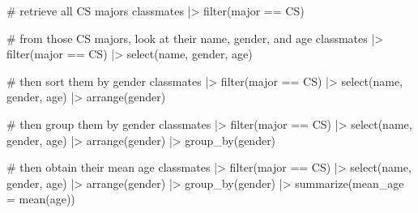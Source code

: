 \documentclass[
  letterpaper,
  DIV=11,
  numbers=noendperiod]{scrreprt}
\newenvironment{Shaded}{\begin{snugshade}}{\end{snugshade}}
\newcommand{\AttributeTok}[1]{\textcolor[rgb]{0.40,0.45,0.13}{#1}}
\newcommand{\CommentTok}[1]{\textcolor[rgb]{0.37,0.37,0.37}{#1}}
\newcommand{\FunctionTok}[1]{\textcolor[rgb]{0.28,0.35,0.67}{#1}}
\newcommand{\NormalTok}[1]{\textcolor[rgb]{0.00,0.23,0.31}{#1}}
\newcommand{\SpecialCharTok}[1]{\textcolor[rgb]{0.37,0.37,0.37}{#1}}
\newcommand{\StringTok}[1]{\textcolor[rgb]{0.13,0.47,0.30}{#1}}
\begin{document}
\begin{tcolorbox}[enhanced jigsaw, colbacktitle=quarto-callout-tip-color!10!white, opacitybacktitle=0.6, breakable, left=2mm, leftrule=.75mm, toprule=.15mm, toptitle=1mm, bottomtitle=1mm, colframe=quarto-callout-tip-color-frame, opacityback=0, coltitle=black, arc=.35mm, titlerule=0mm, colback=white, bottomrule=.15mm, title=\textcolor{quarto-callout-tip-color}{\faLightbulb}\hspace{0.5em}{Answer}, rightrule=.15mm]

\begin{Shaded}
\begin{Highlighting}[]
\CommentTok{\# retrieve all CS majors}
\NormalTok{classmates }\SpecialCharTok{|\textgreater{}} 
  \FunctionTok{filter}\NormalTok{(major }\SpecialCharTok{==} \StringTok{\textquotesingle{}CS\textquotesingle{}}\NormalTok{)}

\CommentTok{\# from those CS majors, look at their name, gender, and age}
\NormalTok{classmates }\SpecialCharTok{|\textgreater{}} 
  \FunctionTok{filter}\NormalTok{(major }\SpecialCharTok{==} \StringTok{\textquotesingle{}CS\textquotesingle{}}\NormalTok{) }\SpecialCharTok{|\textgreater{}}
  \FunctionTok{select}\NormalTok{(name, gender, age)}

\CommentTok{\# then sort them by gender}
\NormalTok{classmates }\SpecialCharTok{|\textgreater{}} 
  \FunctionTok{filter}\NormalTok{(major }\SpecialCharTok{==} \StringTok{\textquotesingle{}CS\textquotesingle{}}\NormalTok{) }\SpecialCharTok{|\textgreater{}}
  \FunctionTok{select}\NormalTok{(name, gender, age) }\SpecialCharTok{|\textgreater{}}
  \FunctionTok{arrange}\NormalTok{(gender)}

\CommentTok{\# then group them by gender}
\NormalTok{classmates }\SpecialCharTok{|\textgreater{}} 
  \FunctionTok{filter}\NormalTok{(major }\SpecialCharTok{==} \StringTok{\textquotesingle{}CS\textquotesingle{}}\NormalTok{) }\SpecialCharTok{|\textgreater{}}
  \FunctionTok{select}\NormalTok{(name, gender, age) }\SpecialCharTok{|\textgreater{}}
  \FunctionTok{arrange}\NormalTok{(gender) }\SpecialCharTok{|\textgreater{}}
  \FunctionTok{group\_by}\NormalTok{(gender)}

\CommentTok{\# then obtain their mean age}
\NormalTok{classmates }\SpecialCharTok{|\textgreater{}}  
  \FunctionTok{filter}\NormalTok{(major }\SpecialCharTok{==} \StringTok{\textquotesingle{}CS\textquotesingle{}}\NormalTok{) }\SpecialCharTok{|\textgreater{}}
  \FunctionTok{select}\NormalTok{(name, gender, age) }\SpecialCharTok{|\textgreater{}}
  \FunctionTok{arrange}\NormalTok{(gender) }\SpecialCharTok{|\textgreater{}}
  \FunctionTok{group\_by}\NormalTok{(gender) }\SpecialCharTok{|\textgreater{}}
  \FunctionTok{summarize}\NormalTok{(}\AttributeTok{mean\_age =} \FunctionTok{mean}\NormalTok{(age))}
\end{Highlighting}
\end{Shaded}

\end{tcolorbox}
\end{document}

